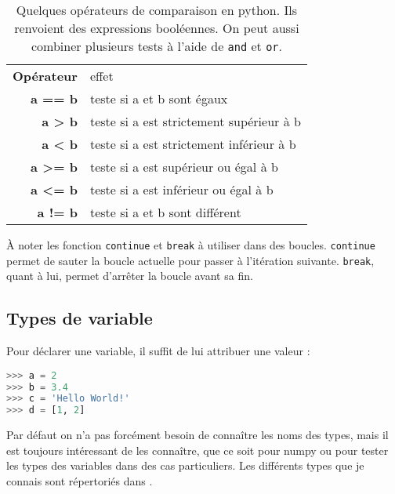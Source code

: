 \documentclass[a4paper,twoside]{article}
\begin{document}
\begin{table}[htb]
\begin{tabular}{>{\bfseries}r<{}@{ : }p{11cm}}
Opérateur &	effet\\
a == b & teste si a et b sont égaux\\
a > b & teste si a est strictement supérieur à b\\
a < b & teste si a est strictement inférieur à b\\
a >= b & teste si a est supérieur ou égal à b\\
a <= b & teste si a est inférieur ou égal à b\\
a != b & teste si a et b sont différent
\end{tabular}
\caption{Quelques opérateurs de comparaison en python. Ils renvoient des expressions booléennes. On peut aussi combiner plusieurs tests à l'aide de \texttt{and} et \texttt{or}.}
\end{table}


\begin{remarque}
À noter les fonction \texttt{continue} et \texttt{break} à utiliser dans des boucles. \texttt{continue} permet de sauter la boucle actuelle pour passer à l'itération suivante. \texttt{break}, quant à lui, permet d'arrêter la boucle avant sa fin.
\end{remarque}



\subsection{Types de variable}
Pour déclarer une variable, il suffit de lui attribuer une valeur :
\begin{lstlisting}[language=python]
>>> a = 2
>>> b = 3.4
>>> c = 'Hello World!'
>>> d = [1, 2]
\end{lstlisting}


Par défaut on n'a pas forcément besoin de connaître les noms des types, mais il est toujours intéressant de les connaître, que ce soit pour numpy ou pour tester les types des variables dans des cas particuliers. Les différents types que je connais sont répertoriés dans .
\end{document}
